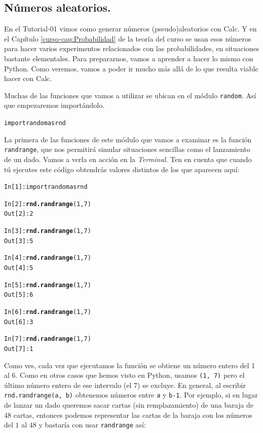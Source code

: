 \documentclass[10pt,a4paper]{article}\usepackage[]{graphicx}\usepackage[]{color}
\makeatletter
\newcommand{\hlkwd}[1]{\textcolor[rgb]{0.737,0.353,0.396}{\textbf{#1}}}%
\newenvironment{kframe}{%
 \def\at@end@of@kframe{}%
 \ifinner\ifhmode%
  \def\at@end@of@kframe{\end{minipage}}%
  \begin{minipage}{\columnwidth}%
 \fi\fi%
 \def\FrameCommand##1{\hskip\@totalleftmargin \hskip-\fboxsep
 \colorbox{shadecolor}{##1}\hskip-\fboxsep
     \hskip-\linewidth \hskip-\@totalleftmargin \hskip\columnwidth}%
 \MakeFramed {\advance\hsize-\width
   \@totalleftmargin\z@ \linewidth\hsize
   \@setminipage}}%
 {\par\unskip\endMakeFramed%
 \at@end@of@kframe}
\newenvironment{knitrout}{}{} %
\makeatother
\begin{document}
\subsection{Números aleatorios.}
\label{tut02:subsec:numerosAleatorios}

En el Tutorial-01 vimos como generar números (pseudo)aleatorios con Calc. Y en el Capítulo \ref{curso-cap:Probabilidad} de la teoría del curso se usan esos números para hacer varios experimentos relacionados con las probabilidades, en situaciones bastante elementales. Para prepararnos, vamos a aprender a hacer lo mismo con Python. Como veremos, vamos a poder ir mucho más allá de lo que resulta viable hacer con Calc.

Muchas de las funciones que vamos a utilizar se ubican en el módulo {\tt random}. Así que empezaremos importándolo.
\begin{knitrout}
\color{fgcolor}\begin{kframe}
\begin{alltt}
import random as rnd
\end{alltt}
\end{kframe}
\end{knitrout}
La primera de las funciones de este módulo que vamos a examinar es la función {\tt randrange}, que nos permitirá simular situaciones sencillas como el lanzamiento de un dado. Vamos a verla en acción en la {\em Terminal}. Ten en cuenta que cuando tú ejecutes este código obtendrás valores distintos de los que aparecen aquí:
\begin{knitrout}
\color{fgcolor}\begin{kframe}
\begin{alltt}
In [1]: import random as rnd

In [2]: \hlkwd{rnd.randrange}(1, 7)
Out[2]: 2

In [3]: \hlkwd{rnd.randrange}(1, 7)
Out[3]: 5

In [4]: \hlkwd{rnd.randrange}(1, 7)
Out[4]: 5

In [5]: \hlkwd{rnd.randrange}(1, 7)
Out[5]: 6

In [6]: \hlkwd{rnd.randrange}(1, 7)
Out[6]: 3

In [7]: \hlkwd{rnd.randrange}(1, 7)
Out[7]: 1
\end{alltt}
\end{kframe}
\end{knitrout}
Como ves, cada vez que ejecutamos la función se obtiene un número entero del 1 al 6. Como en otros casos que hemos visto en Python, usamos {\tt (1, 7)} pero el último número entero de ese intervalo (el 7) se excluye. En general, al escribir {\tt rnd.randrange(a, b)} obtenemos números entre {\tt a} y {\tt b-1}. Por ejemplo, si en lugar de lanzar un dado queremos sacar cartas (sin remplazamiento) de una baraja de 48 cartas, entonces podemos representar las cartas de la baraja con los números del $1$ al $48$ y bastaría con usar {\tt randrange} así:
\end{document}
